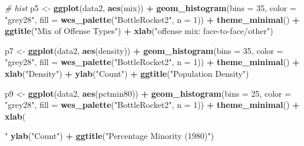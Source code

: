 \documentclass[]{article}
\newenvironment{Shaded}{\begin{snugshade}}{\end{snugshade}}
\newcommand{\CommentTok}[1]{\textcolor[rgb]{0.56,0.35,0.01}{\textit{#1}}}
\newcommand{\DataTypeTok}[1]{\textcolor[rgb]{0.13,0.29,0.53}{#1}}
\newcommand{\DecValTok}[1]{\textcolor[rgb]{0.00,0.00,0.81}{#1}}
\newcommand{\KeywordTok}[1]{\textcolor[rgb]{0.13,0.29,0.53}{\textbf{#1}}}
\newcommand{\NormalTok}[1]{#1}
\newcommand{\OperatorTok}[1]{\textcolor[rgb]{0.81,0.36,0.00}{\textbf{#1}}}
\newcommand{\StringTok}[1]{\textcolor[rgb]{0.31,0.60,0.02}{#1}}
\begin{document}
\begin{Shaded}
\begin{Highlighting}[]
\CommentTok{# hist}
\NormalTok{p5 <-}\StringTok{ }\KeywordTok{ggplot}\NormalTok{(data2, }\KeywordTok{aes}\NormalTok{(mix)) }\OperatorTok{+}
\StringTok{  }\KeywordTok{geom_histogram}\NormalTok{(}\DataTypeTok{bins =} \DecValTok{35}\NormalTok{, }\DataTypeTok{color =} \StringTok{"grey28"}\NormalTok{, }\DataTypeTok{fill =} \KeywordTok{wes_palette}\NormalTok{(}\StringTok{"BottleRocket2"}\NormalTok{, }\DataTypeTok{n =} \DecValTok{1}\NormalTok{)) }\OperatorTok{+}
\StringTok{  }\KeywordTok{theme_minimal}\NormalTok{() }\OperatorTok{+}
\StringTok{  }\KeywordTok{ggtitle}\NormalTok{(}\StringTok{"Mix of Offense Types"}\NormalTok{) }\OperatorTok{+}
\StringTok{  }\KeywordTok{xlab}\NormalTok{(}\StringTok{"offense mix: face-to-face/other"}\NormalTok{)}

\NormalTok{p7 <-}\StringTok{ }\KeywordTok{ggplot}\NormalTok{(data2, }\KeywordTok{aes}\NormalTok{(density)) }\OperatorTok{+}
\StringTok{  }\KeywordTok{geom_histogram}\NormalTok{(}\DataTypeTok{bins =} \DecValTok{35}\NormalTok{, }\DataTypeTok{color =} \StringTok{"grey28"}\NormalTok{, }\DataTypeTok{fill =} \KeywordTok{wes_palette}\NormalTok{(}\StringTok{"BottleRocket2"}\NormalTok{, }\DataTypeTok{n =} \DecValTok{1}\NormalTok{)) }\OperatorTok{+}
\StringTok{  }\KeywordTok{theme_minimal}\NormalTok{() }\OperatorTok{+}
\StringTok{  }\KeywordTok{xlab}\NormalTok{(}\StringTok{"Density"}\NormalTok{) }\OperatorTok{+}
\StringTok{  }\KeywordTok{ylab}\NormalTok{(}\StringTok{"Count"}\NormalTok{) }\OperatorTok{+}
\StringTok{  }\KeywordTok{ggtitle}\NormalTok{(}\StringTok{"Population Density"}\NormalTok{)}

\NormalTok{p9 <-}\StringTok{ }\KeywordTok{ggplot}\NormalTok{(data2, }\KeywordTok{aes}\NormalTok{(pctmin80)) }\OperatorTok{+}
\StringTok{  }\KeywordTok{geom_histogram}\NormalTok{(}\DataTypeTok{bins =} \DecValTok{25}\NormalTok{, }\DataTypeTok{color =} \StringTok{"grey28"}\NormalTok{, }\DataTypeTok{fill =} \KeywordTok{wes_palette}\NormalTok{(}\StringTok{"BottleRocket2"}\NormalTok{, }\DataTypeTok{n =} \DecValTok{1}\NormalTok{)) }\OperatorTok{+}
\StringTok{  }\KeywordTok{theme_minimal}\NormalTok{() }\OperatorTok{+}
\StringTok{  }\KeywordTok{xlab}\NormalTok{(}\StringTok{"%
\StringTok{  }\KeywordTok{ylab}\NormalTok{(}\StringTok{"Count"}\NormalTok{) }\OperatorTok{+}
\StringTok{  }\KeywordTok{ggtitle}\NormalTok{(}\StringTok{"Percentage Minority (1980)"}\NormalTok{)}


}
\end{Highlighting}
\end{Shaded}
\end{document}
